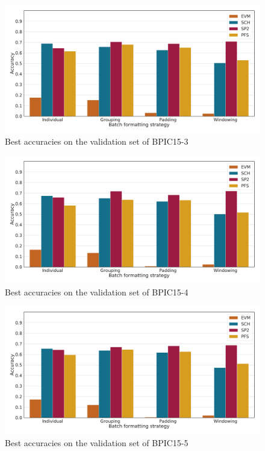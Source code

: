 \begin{figure}[!htb]
    \centering
    \includegraphics[width=\textwidth]{gfx/bpic2015_3/accuracies.pdf}
    \caption{Best accuracies on the validation set of BPIC15-3}
    \label{fig:max-accuracies-bpic2015-3}
\end{figure}
\begin{figure}[!htb]
    \centering
    \includegraphics[width=\textwidth]{gfx/bpic2015_4/accuracies.pdf}
    \caption{Best accuracies on the validation set of BPIC15-4}
    \label{fig:max-accuracies-bpic2015-4}
\end{figure}
\begin{figure}[!htb]
    \centering
    \includegraphics[width=\textwidth]{gfx/bpic2015_5/accuracies.pdf}
    \caption{Best accuracies on the validation set of BPIC15-5}
    \label{fig:max-accuracies-bpic2015-5}
\end{figure}

